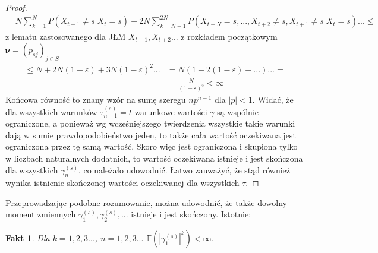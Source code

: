 \documentclass[a4paper]{article}
\theoremstyle{defn}
\theoremstyle{theorem}
\theoremstyle{lemma}
\theoremstyle{cor}
\theoremstyle{fact}
\newtheorem{fact}[defn]{Fakt}
\begin{document}
\begin{proof}
\begin{align*}
    &N\sum\limits_{k = 1}^{N} P(X_{t+1} \neq s| X_t = s) + 2N\sum\limits_{k = N+1}^{2N} P(X_{t+N} = s, ..., X_{t+2} \neq s, X_{t+1} \neq s| X_t = s)...\leq
\end{align*}
z lematu zastosowanego dla JŁM $X_{t+1}, X_{t+2} ...$ z rozkładem początkowym $\boldsymbol{\nu} = (p_{sj})_{j \in S}$
\begin{align*}
    \leq N + 2N(1-\varepsilon) + 3N(1-\varepsilon)^2 ... &= N(1 + 2(1-\varepsilon) + ...) ... = \\
    &= \frac{N}{(1-\varepsilon)^2} < \infty
\end{align*}
Końcowa równość to znany wzór na sumę szeregu $np^{n-1}$ dla $|p| < 1$. Widać, że dla wszystkich warunków $\tau^{(s)}_{n-1} = t$ warunkowe wartości $\gamma$ są wspólnie ograniczone, a ponieważ wg wcześniejszego twierdzenia wszystkie takie warunki dają w sumie prawdopodobieństwo jeden, to także cała wartość oczekiwana jest ograniczona przez tę samą wartość. Skoro więc jest ograniczona i skupiona tylko w liczbach naturalnych dodatnich, to wartość oczekiwana istnieje i jest skończona dla wszystkich $\gamma_n^{(s)}$, co należało udowodnić. Łatwo zauważyć, że stąd również wynika istnienie skończonej wartości oczekiwanej dla wszystkich $\tau$.
\end{proof}
Przeprowadzając podobne rozumowanie, można udowodnić, że także dowolny moment zmiennych $\gamma_1^{(s)}, \gamma_2^{(s)},...$ istnieje i jest skończony. Istotnie:\\
\begin{fact}\label{fact2.5.7}
Dla $k=1,2,3...$, $n = 1,2,3...$  $\mathbb{E}(|\gamma_1^{(s)}|^k) < \infty$.
\end{fact}
\end{document}
